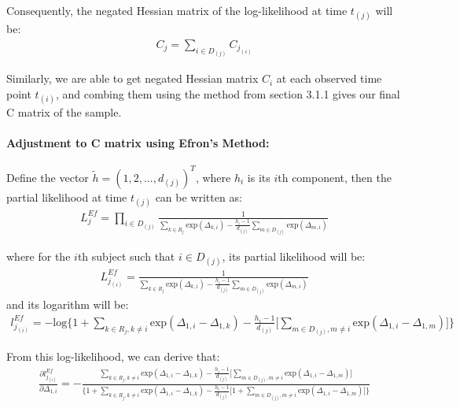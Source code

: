 \documentclass[]{article}
\let\oldparagraph\paragraph
\renewcommand{\paragraph}[1]{\oldparagraph{#1}\mbox{}}
\begin{document}
Consequently, the negated Hessian matrix of the log-likelihood at time
\(t_{(j)}\) will be:
\begin{equation}\begin{aligned}\label{eqn:moreonBresllast}
C_j = \sum_{i \in D_{(j)}}C_{j_{(i)}}
\end{aligned}\end{equation}

Similarly, we are able to get negated Hessian matrix \(C_i\) at each
observed time point \(t_{(i)}\), and combing them using the method from
section 3.1.1 gives our final C matrix of the sample.

\hypertarget{adjustment-to-c-matrix-using-efrons-method}{%
\paragraph{Adjustment to C matrix using Efron's
Method:}\label{adjustment-to-c-matrix-using-efrons-method}}

Define the vector \(\tilde{h}=(1,2,...,d_{(j)})^T\), where \(h_i\) is
its \(i\)th component, then the partial likelihood at time \(t_{(j)}\)
can be written as: \begin{equation}\begin{aligned}\label{eqn:Efron1}
L_j^{Ef} = \prod_{i \in D_{(j)}} \frac{1}{\sum_{k\in R_j}\text{exp}(\Delta_{k,i})-\frac{h_i -1}{d_{(j)}}\sum_{m\in D_{(j)}}\text{exp}(\Delta_{m,i})}
\end{aligned}\end{equation}

where for the \(i\)th subject such that \(i\in D_{(j)}\), its partial
likelihood will be: \begin{equation}\begin{aligned}\label{eqn:Efron2}
L_{j_{(i)}}^{Ef} =\frac{1}{\sum_{k\in R_j}\text{exp}(\Delta_{k,i})-\frac{h_i -1}{d_{(j)}}\sum_{m\in D_{(j)}}\text{exp}(\Delta_{m,i})}
\end{aligned}\end{equation} and its logarithm will be:
\begin{equation}\begin{aligned}\label{eqn:Efron3}
l_{j_{(i)}}^{Ef} = -\text{log}\bigg \{1+ \sum_{k\in R_j, k\neq i}\text{exp}(\Delta_{1,i}-\Delta_{1,k})- \frac{h_i-1}{d_{(j)}}\big[\sum_{m\in D_{(j)}, m\neq i}\text{exp}(\Delta_{1,i}-\Delta_{1,m})\big] \bigg\}
\end{aligned}\end{equation}

From this log-likelihood, we can derive that:
\begin{equation}\begin{aligned}\label{eqn:Efron4}
\frac{\partial l_{j_{(i)}}^{Ef}}{\partial \Delta_{1,i}} = -\frac{\sum_{k\in R_j, k\neq i}\text{exp}(\Delta_{1,i}-\Delta_{1,k})-\frac{h_i-1}{d_{(j)}}\big[\sum_{m\in D_{(j)}, m\neq i}\text{exp}(\Delta_{1,i}-\Delta_{1,m})\big]}{\bigg\{1+\sum_{k\in R_j, k\neq i}\text{exp}(\Delta_{1,i}-\Delta_{1,k})-\frac{h_i-1}{d_{(j)}}\big[1+\sum_{m\in D_{(j)}, m\neq i}\text{exp}(\Delta_{1,i}-\Delta_{1,m})\big]\bigg\}}
\end{aligned}\end{equation}
\end{document}
